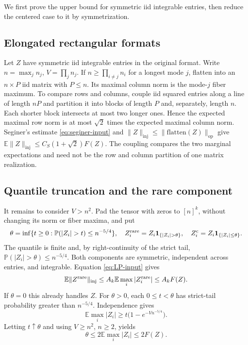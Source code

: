 \documentclass[11pt]{article}
\theoremstyle{spaced}
\theoremstyle{remark}
\numberwithin{equation}{section}
\newcommand{\E}{\mathbb E}
\newcommand{\Pp}{\mathbb P}
\newcommand{\inj}{\mathrm{inj}}
\begin{document}
We first prove the upper bound for symmetric iid integrable entries,
then reduce the centered case to it by symmetrization.

\subsection{Elongated rectangular formats}\label{sec:rectangular}

Let $Z$ have symmetric iid integrable entries in the original format. Write $n=\max_jn_j$, $V=\prod_jn_j$.
If $n\ge\prod_{i\ne j}n_i$ for a longest mode $j$, flatten into an
$n\times P$ iid matrix with $P\le n$. Its maximal column norm is the
mode-$j$ fiber maximum. To compare rows and columns, couple iid squared
entries along a line of length $nP$ and partition it into blocks of
length $P$ and, separately, length $n$. Each shorter block intersects
at most two longer ones. Hence the expected maximal row norm is at
most $\sqrt2$ times the expected maximal column norm. Seginer's estimate \eqref{eq:seginer-input} and
$\|Z\|_{\inj}\le\|\mathrm{flatten}(Z)\|_{\mathrm{op}}$ give
$\E\|Z\|_{\inj}\le C_S(1+\sqrt2)F(Z)$.
The coupling compares the two marginal expectations and need not
be the row and column partition of one matrix realization.

\subsection{Quantile truncation and the rare component}\label{sec:truncation}

It remains to consider $V>n^2$. Pad the tensor with zeros to $[n]^k$,
without changing its norm or fiber maxima, and put
\[
 \theta=\inf\{t\ge0:\Pp(|Z_i|>t)\le n^{-5/4}\},\quad
 Z^{\rm rare}_i=Z_i\mathbf1_{\{|Z_i|>\theta\}},\quad
 Z^{\rm c}_i=Z_i\mathbf1_{\{|Z_i|\le\theta\}}.
\]
The quantile is finite and, by right-continuity of the strict tail,
$\Pp(|Z_i|>\theta)\le n^{-5/4}$.
Both components are symmetric, independent across entries, and
integrable. Equation \eqref{eq:LP-input} gives
\[
 \E\|Z^{\rm rare}\|_{\inj}
 \le A_k\E\max_i|Z^{\rm rare}_i|\le A_kF(Z).
\]
If $\theta=0$ this already handles $Z$. For $\theta>0$, each $0\le t<\theta$
has strict-tail probability greater than $n^{-5/4}$. Independence gives
\[
 \E\max_i|Z_i|\ge
 t\bigl(1-e^{-Vn^{-5/4}}\bigr).
\]
Letting $t\uparrow\theta$ and using $V\ge n^2$, $n\ge2$, yields
\begin{equation}\label{eq:theta-charge}
 \theta\le2\E\max_i|Z_i|\le2F(Z).
\end{equation}
\end{document}
